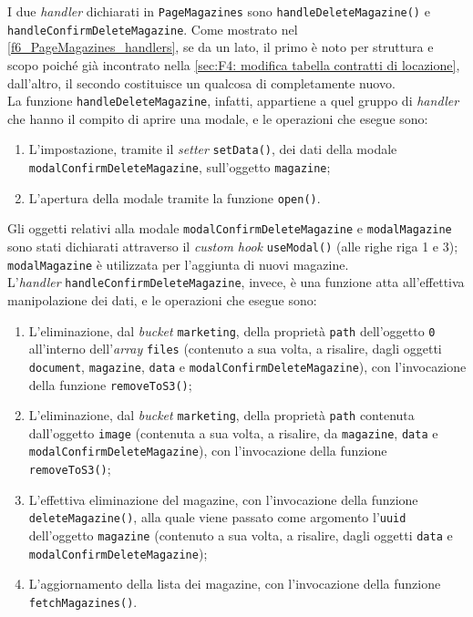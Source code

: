 
I due \textit{handler} dichiarati in \texttt{PageMagazines} sono \texttt{handleDeleteMagazine()} e \\\texttt{handleConfirmDeleteMagazine}. Come mostrato nel \autoref{f6_PageMagazines_handlers}, se da un lato, il primo è noto per struttura e scopo poiché già incontrato nella \autoref{sec:F4: modifica tabella contratti di locazione}, dall'altro, il secondo costituisce un qualcosa di completamente nuovo.\\
La funzione \texttt{handleDeleteMagazine}, infatti, appartiene a quel gruppo di \textit{handler} che hanno il compito di aprire una modale, e le operazioni che esegue sono: 
\begin{enumerate}
    \item L'impostazione, tramite il \textit{setter} \texttt{setData()}, dei dati della modale \\\texttt{modalConfirmDeleteMagazine}, sull'oggetto \texttt{magazine};
    
    \item L'apertura della modale tramite la funzione \texttt{open()}.
\end{enumerate}
Gli oggetti relativi alla modale \texttt{modalConfirmDeleteMagazine} e \texttt{modalMagazine} sono stati dichiarati attraverso il \textit{custom hook} \texttt{useModal()} (alle righe riga 1 e 3); \texttt{modalMagazine} è utilizzata per l'aggiunta di nuovi magazine.\\
L'\textit{handler} \texttt{handleConfirmDeleteMagazine}, invece, è una funzione atta all'effettiva manipolazione dei dati, e le operazioni che esegue sono: 
\begin{enumerate}
    \item L'eliminazione, dal \textit{bucket} \texttt{marketing}, della proprietà \texttt{path} dell'oggetto \texttt{0} all'interno dell'\textit{array} \texttt{files} (contenuto a sua volta, a risalire, dagli oggetti \texttt{document}, \texttt{magazine}, \texttt{data} e \texttt{modalConfirmDeleteMagazine}), con l'invocazione della funzione \texttt{removeToS3()};
    
    \item L'eliminazione, dal \textit{bucket} \texttt{marketing}, della proprietà \texttt{path} contenuta dall'oggetto \texttt{image} (contenuta a sua volta, a risalire, da \texttt{magazine}, \texttt{data} e \texttt{modalConfirmDeleteMagazine}), con l'invocazione della funzione \texttt{removeToS3()};
    
    \item L'effettiva eliminazione del magazine, con l'invocazione della funzione \texttt{deleteMagazine()}, alla quale viene passato come argomento l'\texttt{uuid} dell'oggetto \texttt{magazine} (contenuto a sua volta, a risalire, dagli oggetti \texttt{data} e \texttt{modalConfirmDeleteMagazine});
    
    \item L'aggiornamento della lista dei magazine, con l'invocazione della funzione \texttt{fetchMagazines()}.
\end{enumerate}


